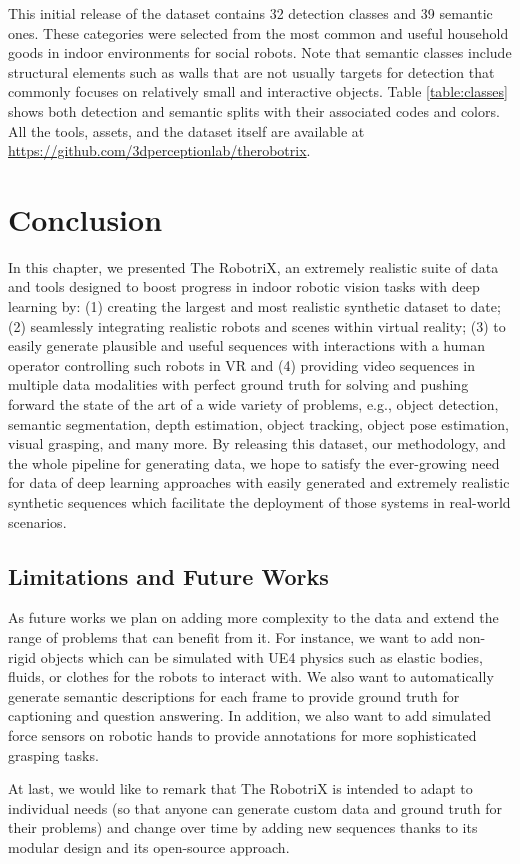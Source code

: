 This initial release of the dataset contains 32 detection classes and 39 semantic ones. These categories were selected from the most common and useful household goods in indoor environments for social robots. Note that semantic classes include structural elements such as walls that are not usually targets for detection that commonly focuses on relatively small and interactive objects. Table \ref{table:classes} shows both detection and semantic splits with their associated codes and colors. All the tools, assets, and the dataset itself are available at \url{https://github.com/3dperceptionlab/therobotrix}.

\section{Conclusion}
\label{cha:sim2real:sec:conclusion}

In this chapter, we presented The RobotriX, an extremely realistic suite of data and tools designed to boost progress in indoor robotic vision tasks with deep learning by: (1) creating the largest and most realistic synthetic dataset to date; (2) seamlessly integrating realistic robots and scenes within virtual reality; (3) to easily generate plausible and useful sequences with interactions with a human operator controlling such robots in \ac{VR} and (4) providing video sequences in multiple data modalities with perfect ground truth for solving and pushing forward the state of the art of a wide variety of problems, e.g., object detection, semantic segmentation, depth estimation, object tracking, object pose estimation, visual grasping, and many more. By releasing this dataset, our methodology, and the whole pipeline for generating data, we hope to satisfy the ever-growing need for data of deep learning approaches with easily generated and extremely realistic synthetic sequences which facilitate the deployment of those systems in real-world scenarios. 

\subsection{Limitations and Future Works}
\label{cha:sim2real:sec:conclusion:subsec:limitations}

As future works we plan on adding more complexity to the data and extend the range of problems that can benefit from it. For instance, we want to add non-rigid objects which can be simulated with \acl{UE4} physics such as elastic bodies, fluids, or clothes for the robots to interact with. We also want to automatically generate semantic descriptions for each frame to provide ground truth for captioning and question answering. In addition, we also want to add simulated force sensors on robotic hands to provide annotations for more sophisticated grasping tasks.

At last, we would like to remark that The RobotriX is intended to adapt to individual needs (so that anyone can generate custom data and ground truth for their problems) and change over time by adding new sequences thanks to its modular design and its open-source approach.